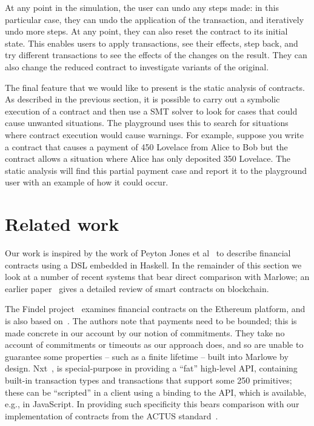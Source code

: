 \documentclass[runningheads]{llncs}
\begin{document}
At any point in the simulation, the user can undo any steps made: in this particular case, they can undo the application of the transaction, and iteratively undo more steps. At any point, they can also reset the contract to its initial state. This enables users to apply transactions, see their effects, step back, and try different transactions to see the effects of the changes on the result. They can also change the reduced contract to investigate variants of the original.

The final feature that we would like to present is the static analysis of contracts. As described in the previous section, it is possible to carry out a symbolic execution of a contract and then use a SMT solver to look for cases that could cause unwanted situations. The playground uses this to search for situations where contract execution would cause warnings. For example, suppose you write a contract that causes a payment of 450 Lovelace from Alice to Bob but the contract allows a situation where Alice has only deposited 350 Lovelace. The static analysis will find this partial payment case and report it to the playground user with an example of how it could occur.

\section{Related work}
\label{sec:related}

Our work is inspired by the work of Peyton Jones et al~\cite{PeytonJones:2000} to describe financial contracts using a DSL embedded in Haskell. 
In the remainder of this section we look at a number of recent systems that bear direct comparison with Marlowe; an earlier paper~\cite{cryptoeprint:2016:1156} gives a detailed review of smart contracts on blockchain. 

The Findel project~\cite{findel} examines financial contracts on the Ethereum platform, and is also based on~\cite{PeytonJones:2000}. The authors note that payments need to be bounded; this is made concrete in our
account by our notion of commitments. They take no account of commitments or timeouts as our approach does, and so are unable to guarantee some properties -- such as a finite lifetime -- built into Marlowe by design.
Nxt~\cite{Nxt}, is special-purpose in providing a ``fat'' high-level
API, containing built-in transaction types and transactions that support some 250 primitives; these can be ``scripted'' in a client using a binding to the API, which is available, e.g., in JavaScript. In providing such specificity this bears comparison with our implementation of contracts from the ACTUS standard~\cite{actus}.
\end{document}
